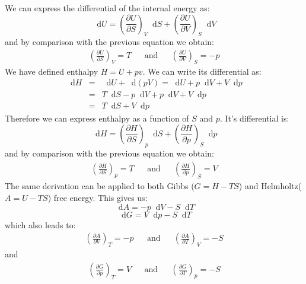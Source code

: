 \documentclass[12pt,a4paper]{report}
\newcommand*\diff{\mathop{}\!\mathrm{d}}
\begin{document}
   We can express the differential of the internal energy as:
   \begin{equation*}
   \diff U=\left(\frac{\partial U}{\partial S}\right)_{V} \diff S+\left(\frac{\partial U}{\partial V}\right)_{S} \diff V
   \end{equation*}
   and by comparison with the previous equation we obtain:
   \begin{align*}
   \left(\frac{\partial U}{\partial S}\right)_{V}=T &&\mathrm{and}&& 
   \left(\frac{\partial U}{\partial V}\right)_{S}=-p
   \end{align*}
   We have defined enthalpy $H = U+pv$. We can write its differential as:
   \begin{eqnarray*}
   \diff H &=& \diff U+\diff(pV)= \diff U+p\diff V + V\diff p \\
   &=&T\diff S-p\diff V+p\diff V + V\diff p\\
   &=& T\diff S+V\diff p
   \end{eqnarray*}
   Therefore we can express enthalpy as a function of $S$ and $p$. It's differential is:
   \begin{equation*}
   \diff H=\left(\frac{\partial H}{\partial S}\right)_{p} \diff S+\left(\frac{\partial H}{\partial p}\right)_{S} \diff p
   \end{equation*}
    and by comparison with the previous equation we obtain:
   \begin{align*}
   \left(\frac{\partial H}{\partial S}\right)_{p}=T &&\mathrm{and}&& 
   \left(\frac{\partial H}{\partial p}\right)_{S}=V
   \end{align*}
   The same derivation can be applied to both Gibbs ($G=H-TS$) and Helmholtz($A=U-TS$) free energy. This gives us:
   \begin{equation*}
   \diff A= -p \diff V -S \diff T 
   \end{equation*}
   \begin{equation*}
   \diff G= V \diff p-S \diff T
   \end{equation*}
   which also leads to:
   \begin{align*}
   \left(\frac{\partial A}{\partial V}\right)_{T}=-p &&\mathrm{and}&& 
   \left(\frac{\partial A}{\partial T}\right)_{V}=-S
   \end{align*}
   and 
   \begin{align*}
   \left(\frac{\partial G}{\partial p}\right)_{T}=V &&\mathrm{and}&& 
   \left(\frac{\partial G}{\partial T}\right)_{p}=-S
   \end{align*}
\end{document}
